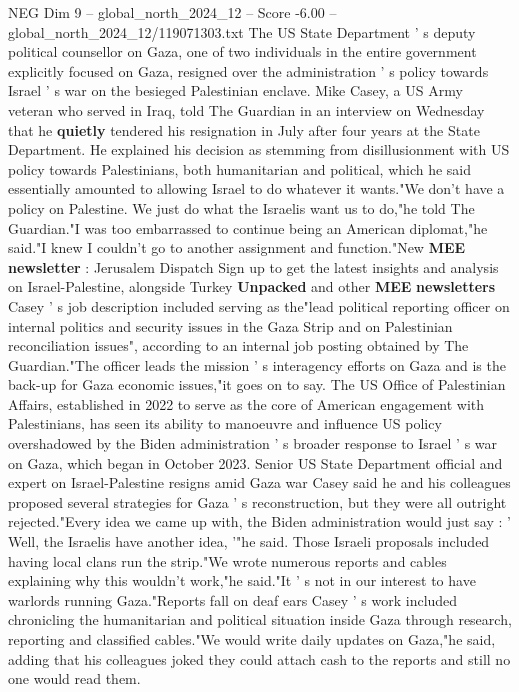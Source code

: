 \begin{textsample}{NEG Dim 9 – global\_north\_2024\_12 – Score -6.00 – global\_north\_2024\_12/119071303.txt}  \label{ex:f9_neg_119}
The US State Department ' s deputy political counsellor on Gaza, one of two individuals in the entire government explicitly focused on Gaza, resigned over the administration ' s policy towards Israel ' s war on the besieged Palestinian enclave.
Mike Casey, a US Army veteran who served in Iraq, told The Guardian in an interview on Wednesday that he \textbf{quietly} tendered his resignation in July after four years at the State Department.
He explained his decision as stemming from disillusionment with US policy towards Palestinians, both humanitarian and political, which he said essentially amounted to allowing Israel to do whatever it wants."We don't have a policy on Palestine.
We just do what the Israelis want us to do,"he told The Guardian."I was too embarrassed to continue being an American diplomat,"he said."I knew I couldn't go to another assignment and function."New \textbf{MEE} \textbf{newsletter} : Jerusalem Dispatch Sign up to get the latest insights and analysis on Israel-Palestine, alongside Turkey \textbf{Unpacked} and other \textbf{MEE} \textbf{newsletters} Casey ' s job description included serving as the"lead political reporting officer on internal politics and security issues in the Gaza Strip and on Palestinian reconciliation issues", according to an internal job posting obtained by The Guardian."The officer leads the mission ' s interagency efforts on Gaza and is the back-up for Gaza economic issues,"it goes on to say.
The US Office of Palestinian Affairs, established in 2022 to serve as the core of American engagement with Palestinians, has seen its ability to manoeuvre and influence US policy overshadowed by the Biden administration ' s broader response to Israel ' s war on Gaza, which began in October 2023.
Senior US State Department official and expert on Israel-Palestine resigns amid Gaza war Casey said he and his colleagues proposed several strategies for Gaza ' s reconstruction, but they were all outright rejected."Every idea we came up with, the Biden administration would just say : ' Well, the Israelis have another idea, '"he said.
Those Israeli proposals included having local clans run the strip."We wrote numerous reports and cables explaining why this wouldn't work,"he said."It ' s not in our interest to have warlords running Gaza."Reports fall on deaf ears Casey ' s work included chronicling the humanitarian and political situation inside Gaza through research, reporting and classified cables."We would write daily updates on Gaza,"he said, adding that his colleagues joked they could attach cash to the reports and still no one would read them.

\end{textsample}
